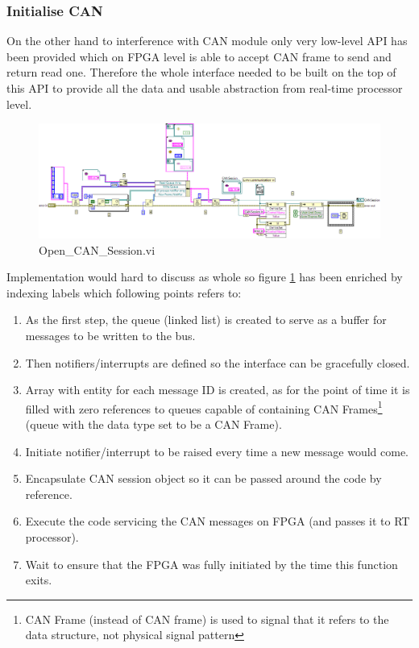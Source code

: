 \subsubsection{Initialise CAN}
On the other hand to interference with CAN module only very low-level API has been provided which on FPGA level is able to accept CAN frame to send and return read one. Therefore the whole interface needed to be built on the top of this API to provide all the data and usable abstraction from real-time processor level.
\begin{figure}[h]
    \centering
    \includegraphics[scale=\visc,max width=\textwidth]{figures/Open_CAN_Sessiond}
    \caption{Open\_CAN\_Session.vi}
    \label{vi:Open_CAN_Session}
\end{figure}
Implementation would hard to discuss as whole so figure \ref{vi:Open_CAN_Session} has been enriched by indexing labels which following points refers to:
\begin{enumerate}
    \item As the first step, the queue (linked list) is created to serve as a buffer for messages to be written to the bus.
    \item Then notifiers/interrupts are defined so the interface can be gracefully closed.
    \item Array with entity for each message ID is created, as for the point of time it is filled with zero references to queues capable of containing CAN Frames\footnote{CAN Frame (instead of CAN frame) is used to signal that it refers to the data structure, not physical signal pattern} (queue with the data type set to be a CAN Frame).
    \item Initiate notifier/interrupt to be raised every time a new message would come.
    \item Encapsulate CAN session object so it can be passed around the code by reference.
    \item Execute the code servicing the CAN messages on FPGA (and passes it to RT processor).
    \item Wait to ensure that the FPGA was fully initiated by the time this function exits.
\end{enumerate}

